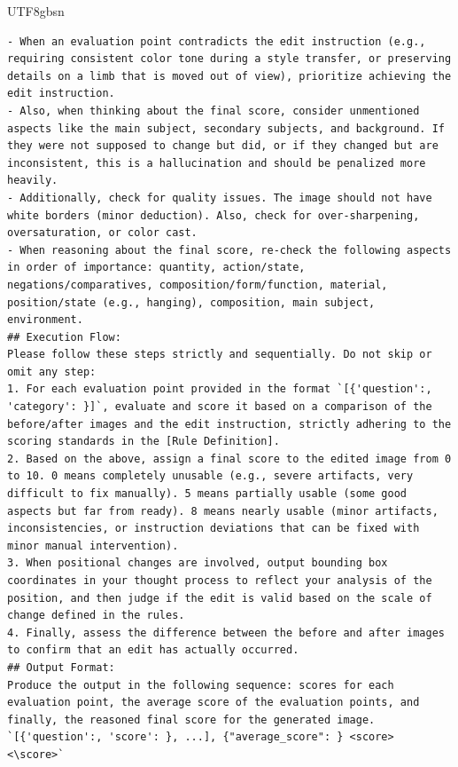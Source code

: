 \documentclass{llmxive}
\begin{document}
\begin{CJK*}{UTF8}{gbsn}
\begin{lstlisting}
- When an evaluation point contradicts the edit instruction (e.g., requiring consistent color tone during a style transfer, or preserving details on a limb that is moved out of view), prioritize achieving the edit instruction.
- Also, when thinking about the final score, consider unmentioned aspects like the main subject, secondary subjects, and background. If they were not supposed to change but did, or if they changed but are inconsistent, this is a hallucination and should be penalized more heavily.
- Additionally, check for quality issues. The image should not have white borders (minor deduction). Also, check for over-sharpening, oversaturation, or color cast.
- When reasoning about the final score, re-check the following aspects in order of importance: quantity, action/state, negations/comparatives, composition/form/function, material, position/state (e.g., hanging), composition, main subject, environment.
## Execution Flow:
Please follow these steps strictly and sequentially. Do not skip or omit any step:
1. For each evaluation point provided in the format `[{'question':, 'category': }]`, evaluate and score it based on a comparison of the before/after images and the edit instruction, strictly adhering to the scoring standards in the [Rule Definition].
2. Based on the above, assign a final score to the edited image from 0 to 10. 0 means completely unusable (e.g., severe artifacts, very difficult to fix manually). 5 means partially usable (some good aspects but far from ready). 8 means nearly usable (minor artifacts, inconsistencies, or instruction deviations that can be fixed with minor manual intervention).
3. When positional changes are involved, output bounding box coordinates in your thought process to reflect your analysis of the position, and then judge if the edit is valid based on the scale of change defined in the rules.
4. Finally, assess the difference between the before and after images to confirm that an edit has actually occurred.
## Output Format:
Produce the output in the following sequence: scores for each evaluation point, the average score of the evaluation points, and finally, the reasoned final score for the generated image.
`[{'question':, 'score': }, ...], {"average_score": } <score> <\score>`
\end{lstlisting}



\end{CJK*}
\end{document}
